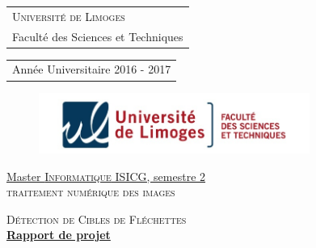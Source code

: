 \documentclass[a4paper, 11pt]{article}
\begin{document}
%
%

\begin{titlepage}
\setlength{\headheight}{0cm}
\setlength{\headsep}{0cm}
{
  \noindent
  \begin{tabular}[t]{@{}l}
    \small\textsc{Université de Limoges}\\
    \small{Faculté des Sciences et Techniques}
  \end{tabular}
  \hfill
  \begin{tabular}[t]{l@{}}
    \small{Année Universitaire 2016 - 2017}
  \end{tabular}
  
  \vspace{-5.5mm}
  \begin{figure}[!h]
	\hspace*{-7.5mm}\includegraphics[height=20mm]{img/unilim-fst.jpg}
  \end{figure}
      
  \vspace{20mm}
  \begin{center}
    
    \large\underline{Master \textsc{Informatique} ISICG, semestre 2}\\
    \Large\textsc{traitement numérique des images}
    
    \vspace{15mm}
  
    \begin{tcolorbox}[colback=unilim_blue, colframe=unilim_blue, boxrule=0.5pt, arc=4pt,
                      left=6pt, right=6pt, top=6pt, bottom=6pt, boxsep=0pt]
      \begin{minipage}[h]{\linewidth}
        \begin{center}
        { \color{white}
          \vspace*{5mm}
          \huge\textsc{Détection de Cibles de Fléchettes}\\
          \vspace*{5mm}
          \Large\textbf{\underline{Rapport de projet}}
          \vspace*{5mm}
        }
        \end{center}
      \end{minipage}
    \end{tcolorbox}
    

\end{center}}
\end{titlepage}
\end{document}
